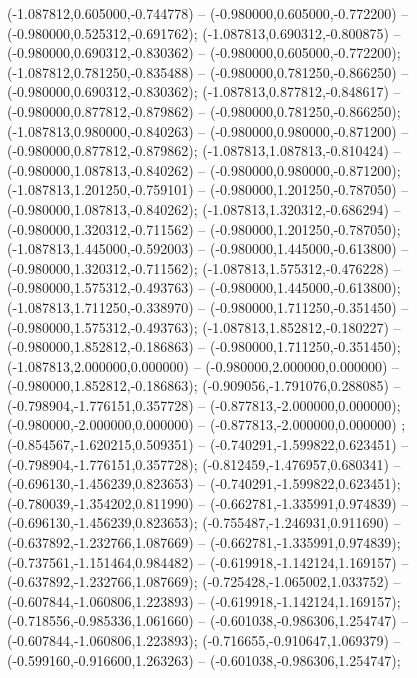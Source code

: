  (-1.087812,0.605000,-0.744778) -- (-0.980000,0.605000,-0.772200) -- (-0.980000,0.525312,-0.691762);
 (-1.087813,0.690312,-0.800875) -- (-0.980000,0.690312,-0.830362) -- (-0.980000,0.605000,-0.772200);
 (-1.087812,0.781250,-0.835488) -- (-0.980000,0.781250,-0.866250) -- (-0.980000,0.690312,-0.830362);
 (-1.087813,0.877812,-0.848617) -- (-0.980000,0.877812,-0.879862) -- (-0.980000,0.781250,-0.866250);
 (-1.087813,0.980000,-0.840263) -- (-0.980000,0.980000,-0.871200) -- (-0.980000,0.877812,-0.879862);
 (-1.087813,1.087813,-0.810424) -- (-0.980000,1.087813,-0.840262) -- (-0.980000,0.980000,-0.871200);
 (-1.087813,1.201250,-0.759101) -- (-0.980000,1.201250,-0.787050) -- (-0.980000,1.087813,-0.840262);
 (-1.087813,1.320312,-0.686294) -- (-0.980000,1.320312,-0.711562) -- (-0.980000,1.201250,-0.787050);
 (-1.087813,1.445000,-0.592003) -- (-0.980000,1.445000,-0.613800) -- (-0.980000,1.320312,-0.711562);
 (-1.087813,1.575312,-0.476228) -- (-0.980000,1.575312,-0.493763) -- (-0.980000,1.445000,-0.613800);
 (-1.087813,1.711250,-0.338970) -- (-0.980000,1.711250,-0.351450) -- (-0.980000,1.575312,-0.493763);
 (-1.087813,1.852812,-0.180227) -- (-0.980000,1.852812,-0.186863) -- (-0.980000,1.711250,-0.351450);
 (-1.087813,2.000000,0.000000) -- (-0.980000,2.000000,0.000000) -- (-0.980000,1.852812,-0.186863);
 (-0.909056,-1.791076,0.288085) -- (-0.798904,-1.776151,0.357728) -- (-0.877813,-2.000000,0.000000);
 (-0.980000,-2.000000,0.000000) -- (-0.877813,-2.000000,0.000000) ;
 (-0.854567,-1.620215,0.509351) -- (-0.740291,-1.599822,0.623451) -- (-0.798904,-1.776151,0.357728);
 (-0.812459,-1.476957,0.680341) -- (-0.696130,-1.456239,0.823653) -- (-0.740291,-1.599822,0.623451);
 (-0.780039,-1.354202,0.811990) -- (-0.662781,-1.335991,0.974839) -- (-0.696130,-1.456239,0.823653);
 (-0.755487,-1.246931,0.911690) -- (-0.637892,-1.232766,1.087669) -- (-0.662781,-1.335991,0.974839);
 (-0.737561,-1.151464,0.984482) -- (-0.619918,-1.142124,1.169157) -- (-0.637892,-1.232766,1.087669);
 (-0.725428,-1.065002,1.033752) -- (-0.607844,-1.060806,1.223893) -- (-0.619918,-1.142124,1.169157);
 (-0.718556,-0.985336,1.061660) -- (-0.601038,-0.986306,1.254747) -- (-0.607844,-1.060806,1.223893);
 (-0.716655,-0.910647,1.069379) -- (-0.599160,-0.916600,1.263263) -- (-0.601038,-0.986306,1.254747);
